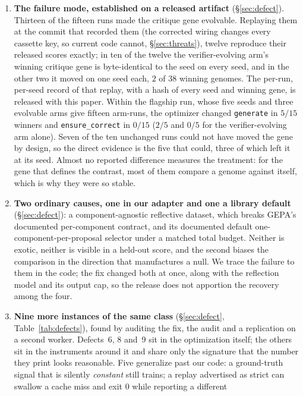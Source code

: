 \documentclass[11pt]{article}
\begin{document}
\begin{enumerate}
  \item \textbf{The failure mode, established on a released artifact} (\S\ref{sec:defect}).
    Thirteen of the fifteen runs made the critique gene evolvable. Replaying them at the commit
    that recorded them (the corrected wiring changes every cassette key, so current code cannot,
    \S\ref{sec:threats}), twelve reproduce their released scores exactly; in ten of the twelve the
    verifier-evolving arm's winning critique gene is byte-identical to the seed on every seed, and
    in the other two it moved on one seed each, $2$ of $38$ winning genomes. The per-run, per-seed
    record of that replay, with a hash of every seed and winning gene, is released with this
    paper. Within the
    flagship run, whose five seeds and three evolvable arms give fifteen
    arm-runs, the optimizer changed \texttt{generate} in $5/15$ winners and
    \texttt{ensure\_correct} in $0/15$ ($2/5$ and $0/5$ for the verifier-evolving arm alone). Seven
    of the ten unchanged runs could not have moved the gene by design, so the direct evidence is
    the five that could, three of which left it at its seed. Almost no reported difference
    measures the treatment: for the gene that defines the contrast, most of them compare a genome
    against itself, which is why they were so stable.
  \item \textbf{Two ordinary causes, one in our adapter and one a library default}
    (\S\ref{sec:defect}): a component-agnostic reflective dataset, which breaks GEPA's documented
    per-component contract, and its documented default one-component-per-proposal selector under a
    matched total budget. Neither is exotic, neither is visible in a held-out score, and the second
    biases the comparison in the direction that manufactures a null. We trace the failure to them
    in the code; the fix changed both at once, along with the reflection model and its output cap,
    so the release does not apportion the recovery among the four.
  \item \textbf{Nine more instances of the same class} (\S\ref{sec:defect},
    Table~\ref{tab:defects}), found by auditing the fix, the audit and a replication on a second
    worker. Defects~6, 8 and~9 sit in the optimization itself; the others sit in the instruments
    around it and share only the signature that the number they print looks reasonable. Five
    generalize past our code: a ground-truth signal that is silently \emph{constant} still trains;
    a replay advertised as strict can swallow a cache miss and exit $0$ while reporting a different

\end{enumerate}
\end{document}
